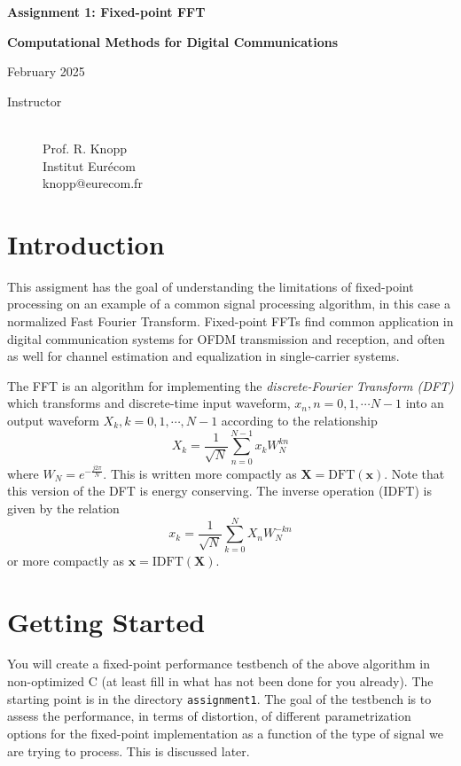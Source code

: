 \documentclass[11pt]{article}
\begin{document}
\parindent 0cm
\centerline{\Large\bf Assignment 1: Fixed-point FFT}
\centerline{\Large\bf Computational Methods for Digital Communications}
\centerline{\large February 2025}
\makeatletter
\begin{description}
\item[Instructor] \mbox{}\\
Prof. R. Knopp\\
Institut Eur\'ecom\\
knopp@eurecom.fr
\end{description}
\section{Introduction}
This assigment has the goal of understanding the limitations of fixed-point processing on an 
example of a common signal processing algorithm, in this case a normalized Fast Fourier Transform.
Fixed-point FFTs find common application in digital communication systems for OFDM transmission and
reception, and often as well for channel estimation and equalization in single-carrier systems. 

The FFT is an algorithm for implementing the {\em discrete-Fourier Transform (DFT)} which transforms
and discrete-time input waveform, $x_{n}, n=0,1,\cdots N-1$ into an output waveform $X_{k}, k=0,1,\cdots,N-1$
according to the relationship
\begin{equation}
X_{k} = \frac{1}{\sqrt{N}}\sum_{n=0}^{N-1}x_{k}W_{N}^{kn}
\end{equation}
where $W_{N} = e^{-\frac{j2\pi}{N}}$.  This is written more compactly as $\mathbf{X} = \mathrm{DFT}(\mathbf{x})$. 
Note that this version of the DFT is energy conserving.  The inverse operation (IDFT) is given by the relation
\begin{equation}
x_{k} = \frac{1}{\sqrt{N}}\sum_{k=0}^{N}X_{n}W_{N}^{-kn}
\end{equation}
or more compactly as $\mathbf{x} = \mathrm{IDFT}(\mathbf{X})$.  

\section{Getting Started}

You will create a fixed-point performance testbench of the above algorithm in non-optimized C (at least fill in what
has not been done for you already). The starting point is in the directory {\tt assignment1}.  The goal of the testbench is to
assess the performance, in terms of distortion, of different parametrization options for the fixed-point implementation
as a function of the type of signal we are trying to process.  This is discussed later.  
\end{document}
